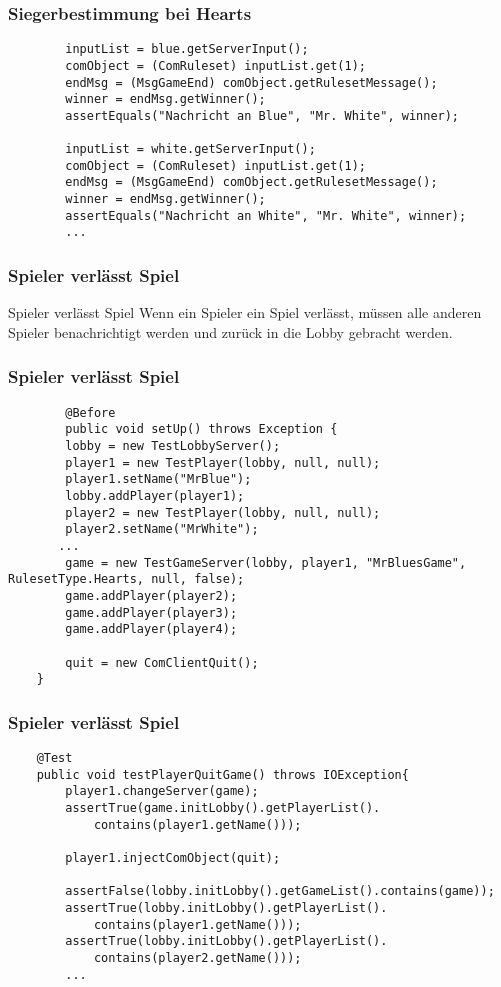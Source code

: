 \documentclass{beamer}
\begin{document}
\begin{frame}[fragile]
\frametitle{Siegerbestimmung bei Hearts}
\begin{lstlisting}
		inputList = blue.getServerInput();
		comObject = (ComRuleset) inputList.get(1);
		endMsg = (MsgGameEnd) comObject.getRulesetMessage();
		winner = endMsg.getWinner();
		assertEquals("Nachricht an Blue", "Mr. White", winner);

		inputList = white.getServerInput();
		comObject = (ComRuleset) inputList.get(1);
		endMsg = (MsgGameEnd) comObject.getRulesetMessage();
		winner = endMsg.getWinner();
		assertEquals("Nachricht an White", "Mr. White", winner);
		...
\end{lstlisting}
\end{frame}

\begin{frame}
\frametitle{Spieler verlässt Spiel}
	\begin{block}
		{Spieler verlässt Spiel} Wenn ein Spieler ein Spiel verlässt, müssen alle anderen Spieler benachrichtigt werden und zurück in die Lobby gebracht werden.
	\end{block}
\end{frame}

\begin{frame}[fragile]
\frametitle{Spieler verlässt Spiel}
\begin{lstlisting}
		@Before
		public void setUp() throws Exception {
		lobby = new TestLobbyServer();
		player1 = new TestPlayer(lobby, null, null);
		player1.setName("MrBlue");
		lobby.addPlayer(player1);		
		player2 = new TestPlayer(lobby, null, null);
		player2.setName("MrWhite");
	   ...	
		game = new TestGameServer(lobby, player1, "MrBluesGame", RulesetType.Hearts, null, false);	
		game.addPlayer(player2);
		game.addPlayer(player3);
		game.addPlayer(player4);
		
		quit = new ComClientQuit();
	}
\end{lstlisting}
\end{frame}


\begin{frame}[fragile]
\frametitle{Spieler verlässt Spiel}
\begin{lstlisting}
	@Test
	public void testPlayerQuitGame() throws IOException{ 	
		player1.changeServer(game);
		assertTrue(game.initLobby().getPlayerList().
		    contains(player1.getName()));
		
		player1.injectComObject(quit);

		assertFalse(lobby.initLobby().getGameList().contains(game));
		assertTrue(lobby.initLobby().getPlayerList().
		    contains(player1.getName()));
		assertTrue(lobby.initLobby().getPlayerList().
		    contains(player2.getName()));
		...
\end{lstlisting}
\end{frame}
\end{document}
